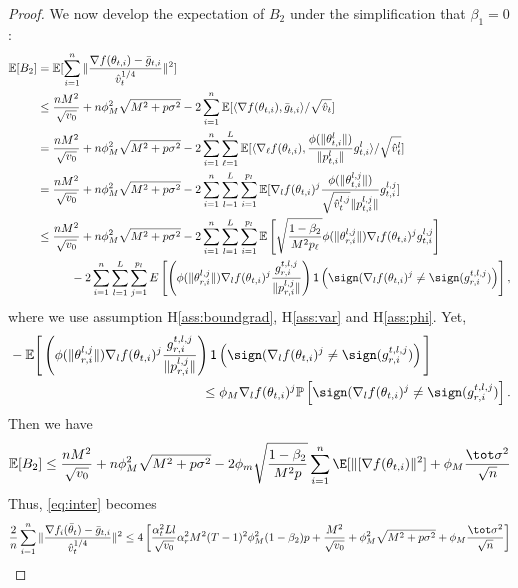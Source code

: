 \documentclass[nohyperref]{article}
\begin{document}
\begin{proof}


We now develop the expectation of $B_2$ under the simplification that $\beta_1 = 0$:
\begin{align}\notag
    \mathbb E[B_2]&=\mathbb E[\sum_{i=1}^n\Vert \frac{\nabla f(\theta_{t,i})-\bar g_{t,i}}{\hat v_t^{1/4}} \Vert^2] \\\notag
    &\leq \frac{nM^2}{\sqrt{v_0}}+n\phi_M^2\sqrt{M^2+p\sigma^2}-2\sum_{i=1}^n\mathbb E[\langle \nabla f(\theta_{t,i}),\bar g_{t,i} \rangle/\sqrt{\hat v_t}]\\\notag
    &=\frac{nM^2}{\sqrt{v_0}}+n\phi_M^2\sqrt{M^2+p\sigma^2}-2\sum_{i=1}^n \sum_{\ell=1}^L \mathbb E[\langle \nabla_\ell f(\theta_{t,i}),\frac{\phi(\|\theta_{t,i}^l \|)}{\| p_{t,i}^l \|}g_{t,i}^l \rangle/\sqrt{\hat v_t^l}]\\\notag
    &=\frac{nM^2}{\sqrt{v_0}}+n\phi_M^2\sqrt{M^2+p\sigma^2}-2\sum_{i=1}^n \sum_{l=1}^L\sum_{i=1}^{p_l} \mathbb E[\nabla_l f(\theta_{t,i})^j\frac{\phi(\|\theta_{t,i}^{l,j} \|)}{\sqrt{\hat v_t^{l,j}}\| p_{t,i}^{l,j} \|}g_{t,i}^{l,j} ]\\\notag
    & \leq \frac{nM^2}{\sqrt{v_0}}+n\phi_M^2\sqrt{M^2+p\sigma^2}-2\sum_{i=1}^n \sum_{l=1}^L\sum_{i=1}^{p_l} \mathbb E \left[ \sqrt{\frac{1-\beta_2}{M^2 p_\ell}}  \phi(\|\theta_{r,i}^{l,j}\|)  \nabla_l f(\theta_{t,i})^j  g_{t,i}^{l,j}\right]\\\notag
    &\hspace{0.4in} -2 \sum_{i = 1}^n \sum_{l=1}^L\sum_{j=1}^{p_l}  E \left[  \left( \phi(\|\theta_{r,i}^{l,j}\|)   \nabla_l f(\theta_{t,i})^j   \frac{g_{r,i}^{t,l,j}}{ \|p_{r,i}^{l,j}\|}\right)\mathsf{1}\left( \sign(  \nabla_l f(\theta_{t,i})^j \neq  \sign( g_{r,i}^{t,l,j}) \right)\right],
\end{align}
where we use assumption H\ref{ass:boundgrad}, H\ref{ass:var} and H\ref{ass:phi}. 
Yet,
\begin{align*}
&- \mathbb E \Bigg[  \left( \phi(\|\theta_{r,i}^{l,j}\|)   \nabla_l f(\theta_{t,i})^j   \frac{g_{r,i}^{t,l,j}}{ \|p_{r,i}^{l,j}\|}\right)\mathsf{1}\left( \sign(  \nabla_l f(\theta_{t,i})^j
\neq  \sign( g_{r,i}^{t,l,j}) \right)\Bigg] \\
&\hspace{2in} \leq  \phi_M \nabla_l f(\theta_{t,i})^j   \mathbb{P}\left[  \sign(  \nabla_l f(\theta_{t,i})^j \neq  \sign( g_{r,i}^{t,l,j}) \right].
\end{align*}
Then we have
\begin{align}\notag
    \mathbb E[B_2]\leq  \frac{nM^2}{\sqrt{v_0}}+n\phi_M^2\sqrt{M^2+p\sigma^2}-2 \phi_m \sqrt{\frac{1-\beta_2}{M^2 p}} \sum_{i=1}^n \E[\| [\nabla f(\theta_{t,i}) \|^2] + \phi_M \frac{\tot \sigma^2}{\sqrt{n}}
\end{align}
Thus, \eqref{eq:inter} becomes
\begin{align}\notag
    \frac{2}{n}\sum_{i=1}^n\Vert \frac{\nabla f_i(\bar\theta_t)-\bar g_{t,i}}{\hat v_t^{1/4}} \Vert^2 \leq 4 \left[ \frac{\alpha_t^2 Ll}{\sqrt{v_0}} \alpha_r^2 M^2 (T-1)^2 \phi_M^2 (1-\beta_2)p + \frac{M^2}{\sqrt{v_0}}+\phi_M^2\sqrt{M^2+p\sigma^2} + \phi_M \frac{\tot \sigma^2}{\sqrt{n}}\right]
\end{align}


\end{proof}
\end{document}

